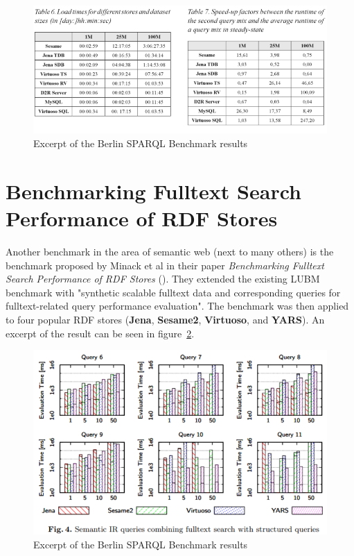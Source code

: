 \begin{figure}[htbp]
	\centering
\includegraphics[width=\textwidth]{img/bsbm_sample.png}
	\caption{Excerpt of the Berlin SPARQL Benchmark results}
	\label{bsbm_sample}
\end{figure}

\section{Benchmarking Fulltext Search Performance of RDF Stores}

Another benchmark in the area of semantic web (next to many others) is the benchmark proposed by Minack et al in their paper \textit{Benchmarking Fulltext Search Performance of RDF Stores} (\cite{minack2009benchmarking}). They extended the existing LUBM benchmark with "synthetic scalable fulltext data and corresponding queries for fulltext-related query performance evaluation". The benchmark was then applied to four popular RDF stores (\textbf{Jena}, \textbf{Sesame2}, \textbf{Virtuoso}, and \textbf{YARS}). An excerpt of the result can be seen in figure~\ref{minack_sample}.

\begin{figure}[htbp]
	\centering
\includegraphics[width=\textwidth]{img/minack_sample.png}
	\caption{Excerpt of the Berlin SPARQL Benchmark results}
	\label{minack_sample}
\end{figure}